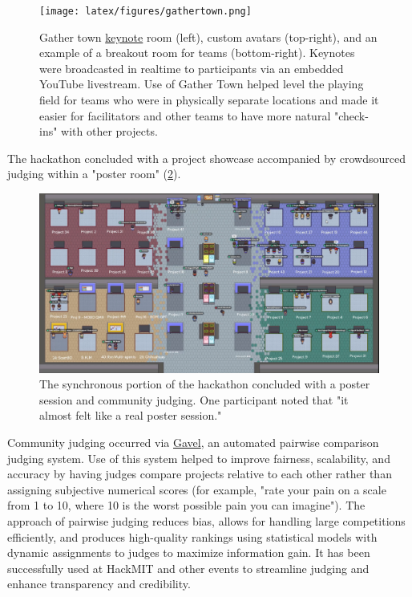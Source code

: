 \documentclass[superscriptaddress, nofootinbib,  amsmath, amssymb, twocolumn]{revtex4-2} %
\begin{document}
\begin{figure}
    \centering
    \texttt{[image: latex/figures/gathertown.png]}
    \caption{Gather town \href{https://ac-bo-hackathon.github.io/videos-slides/}{keynote} room (left), custom avatars (top-right), and an example of a breakout room for teams (bottom-right). Keynotes were broadcasted in realtime to participants via an embedded YouTube livestream. Use of Gather Town helped level the playing field for teams who were in physically separate locations and made it easier for facilitators and other teams to have more natural "check-ins" with other projects.}
    \label{fig:gathertown}
\end{figure}


The hackathon concluded with a project showcase accompanied by crowdsourced judging within a "poster room" (\cref{fig:poster}).

\begin{figure}
    \centering
    \includegraphics[width=0.95\linewidth]{latex/figures/posters.png}
    \caption{The synchronous portion of the hackathon concluded with a poster session and community judging. One participant noted that "it almost felt like a real poster session."}
    \label{fig:poster}
\end{figure}

Community judging occurred via \href{https://github.com/anishathalye/gavel}{Gavel}, an automated pairwise comparison judging system. Use of this system helped to improve fairness, scalability, and accuracy by having judges compare projects relative to each other rather than assigning subjective numerical scores (for example, "rate your pain on a scale from 1 to 10, where 10 is the worst possible pain you can imagine"). The approach of pairwise judging reduces bias, allows for handling large competitions efficiently, and produces high-quality rankings using statistical models with dynamic assignments to judges to maximize information gain. It has been successfully used at HackMIT and other events to streamline judging and enhance transparency and credibility.
\end{document}
